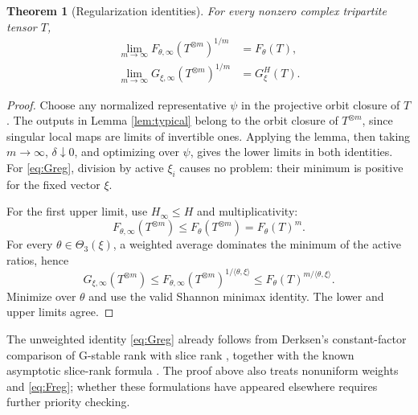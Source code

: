 \documentclass[11pt,a4paper]{article}
\newtheorem{theorem}{Theorem}
\newcommand{\Hinf}{H_{\infty}}
\begin{document}
\begin{theorem}[Regularization identities]\label{thm:regular}
For every nonzero complex tripartite tensor \(T\),
\begin{align}
 \lim_{m\to\infty}F_{\theta,\infty}(T^{\otimes m})^{1/m}
 &=F_\theta(T),\label{eq:Freg}\\
 \lim_{m\to\infty}G_{\xi,\infty}(T^{\otimes m})^{1/m}
 &=G_\xi^{H}(T).\label{eq:Greg}
\end{align}
\end{theorem}
\begin{proof}
Choose any normalized representative \(\psi\) in the projective
orbit closure of \(T\). The outputs in Lemma \ref{lem:typical}
belong to the orbit closure of \(T^{\otimes m}\), since singular
local maps are limits of invertible ones. Applying the lemma,
then taking \(m\to\infty\), \(\delta\downarrow0\), and optimizing
over \(\psi\), gives the lower limits in both identities.
For \eqref{eq:Greg}, division by active \(\xi_i\) causes no problem:
their minimum is positive for the fixed vector \(\xi\).

For the first upper limit, use \(\Hinf\le H\) and multiplicativity:
\[
 F_{\theta,\infty}(T^{\otimes m})
 \le F_\theta(T^{\otimes m})=F_\theta(T)^m .
\]
For every \(\theta\in\Theta_3(\xi)\), a weighted average dominates
the minimum of the active ratios, hence
\[
 G_{\xi,\infty}(T^{\otimes m})
 \le F_{\theta,\infty}(T^{\otimes m})^{1/\langle\theta,\xi\rangle}
 \le F_\theta(T)^{m/\langle\theta,\xi\rangle}.
\]
Minimize over \(\theta\) and use the valid Shannon minimax identity.
The lower and upper limits agree.
\end{proof}

The unweighted identity \eqref{eq:Greg} already follows from
Derksen's constant-factor comparison of G-stable rank with slice
rank \cite{Derksen}, together with the known asymptotic slice-rank
formula \cite{CLZ}. The proof above also treats nonuniform weights
and \eqref{eq:Freg}; whether these formulations have appeared
elsewhere requires further priority checking.
\end{document}
